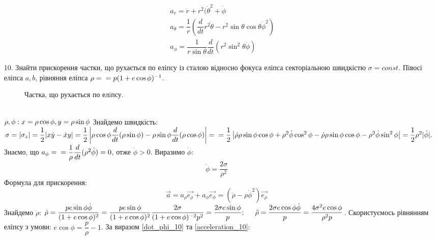 \documentclass[a4paper,12pt]{article}
\newcommand\tab [1][0.5cm]{\hspace*{#1}}
\begin{document}
\begin{justify}
\begin{itemize}
\begin{align*}
					&&a_r=\ddot{r}+r^2(\dot{\theta}^2+\dot{\phi}\\
					&&a_\theta=\dfrac{1}{r}\left(\dfrac{d}{dt}r^2\dot{\theta}-r^2\sin\theta\cos\theta\dot{\phi}^2\right)\\
					&&a_\phi=\dfrac{1}{r\sin\theta}\dfrac{d}{dt}\left(r^2\sin^2\theta\dot{\phi}\right)
			\end{align*}
		\item [10.] Знайти прискорення частки, що рухається по еліпсу із сталою відносно фокуса еліпса секторіальною швидкістю $\sigma = const$. Півосі еліпса $a, b$, рівняння еліпса $\rho=\\= p(1 + e \cos \phi)^{-1}$.\\
			\begin{figure}[htp]
			\centering
			\caption{Частка, що рухається по елiпсу.}
			\label{plot_10}
			\end{figure}\\
			$\rho,\phi:x=\rho\cos\phi,y=\rho\sin\phi\\$
			Знайдемо швидкість: $\sigma=|\sigma_z|=\dfrac12|x\dot{y}-\dot{x}y|=\dfrac12\left|\rho\cos\phi\dfrac{d}{dt}(\rho\sin\phi)-\rho\sin\phi\dfrac{d}{dt}(\rho\cos\phi)\right|=\\=\dfrac12\left|\dot{\rho}\rho\sin\phi\cos\phi+\rho^2\dot{\phi}\cos^2\phi-\dot{\rho}\rho\sin\phi\cos\phi-\rho^2\dot{\phi}\sin^2\phi\right|=\dfrac12\rho^2|\dot{\phi}|.$ Знаємо, що $a_\phi=\\=\dfrac{1}{\rho}\dfrac{d}{dt}(\rho^2\dot{\phi})=0$, отже $\dot{\phi}>0$. Виразимо $\dot{\phi}$:
			\begin{equation}
				\dot{\phi}=\dfrac{2\sigma}{\rho^2}
				\label{dot_phi_10}
			\end{equation}
			Формула для прискорення:
			\begin{equation}
				\vec{a}=a_\rho \vec{e_\rho}+a_\phi \vec{e_\phi}=(\ddot{\rho}-\rho\dot{\phi}^2)\vec{e_\rho}
				\label{acceleration_10}
			\end{equation}
			Знайдемо $\ddot{\rho}$: $\dot{\rho}=\dfrac{p e\sin\phi\dot{\phi}}{(1+e\cos\phi)^2}=\dfrac{p e\sin\phi}{(1+e\cos\phi)^2}\dfrac{2\sigma}{(1+e\cos\phi)^{-2}p^2}=\dfrac{2\sigma e\sin\phi}{p};\tab \\\ddot{\rho}=\dfrac{2\sigma e\cos\phi\dot{\phi}}{p}=\dfrac{4\sigma^2 e\cos\phi}{\rho^2p}$. Скористуємось рівнянням еліпсу з умови: $e\cos\phi=\dfrac{p}{\rho}-1$. За виразом \ref{dot_phi_10} та \ref{acceleration_10}: 

\end{itemize}
\end{justify}
\end{document}
